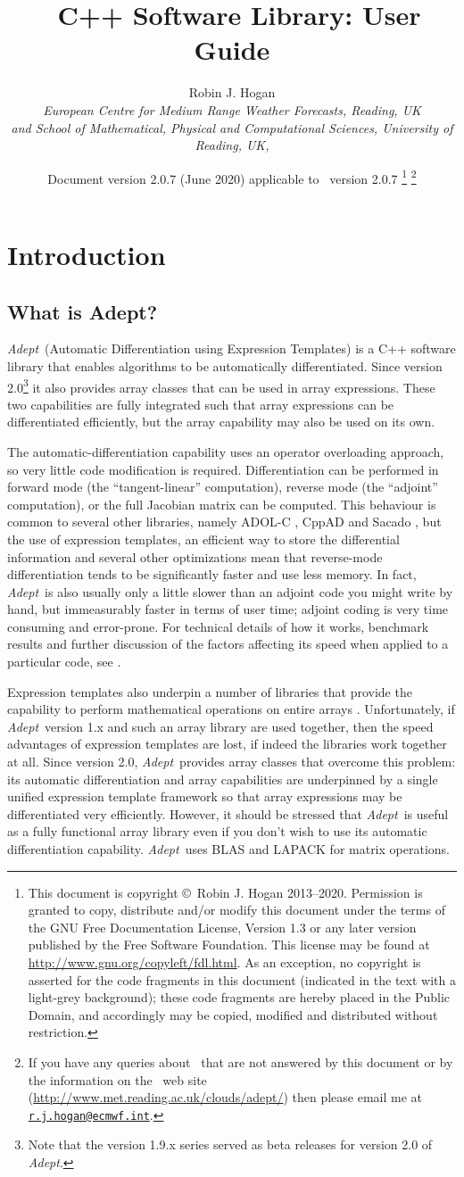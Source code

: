 \documentclass[a4,oneside]{book}
\title{\Adept\ C++ Software Library: User Guide}
\author{Robin J. Hogan\\ \emph{European Centre for Medium Range
    Weather Forecasts, Reading, UK}\\ \emph{and School of
    Mathematical, Physical and Computational Sciences, University of
    Reading, UK,}}
\date{Document version 2.0.7 (June 2020) applicable to \Adept\ version
  2.0.7 \thanks{This document is copyright \copyright\ Robin J. Hogan
    2013--2020.  Permission is granted to copy, distribute and/or
    modify this document under the terms of the GNU Free Documentation
    License, Version 1.3 or any later version published by the Free
    Software Foundation. This license may be found at
    \url{http://www.gnu.org/copyleft/fdl.html}.  As an exception, no
    copyright is asserted for the code fragments in this document
    (indicated in the text with a light-grey background); these code
    fragments are hereby placed in the Public Domain, and accordingly
    may be copied, modified and distributed without restriction.}
  \thanks{If you have any queries about \Adept\ that are not answered
    by this document or by the information on the \Adept\ web site
    (\url{http://www.met.reading.ac.uk/clouds/adept/}) then please
    email me at
    \href{mailto:r.j.hogan@ecmwf.int}{\texttt{r.j.hogan@ecmwf.int}}.}}
\def\Adept{\emph{Adept}}
\renewcommand\thefootnote{\relax}
\begin{document}
\maketitle

\tableofcontents
\def\thefootnote{\fnsymbol{footnote}}
\chapter{Introduction}
\section{What is Adept?}
\Adept\ (Automatic Differentiation using Expression Templates) is a
C++ software library that enables algorithms to be automatically
differentiated. Since version 2.0\footnote{Note that the version 1.9.x
  series served as beta releases for version 2.0 of \Adept.} it also
provides array classes that can be used in array expressions.  These
two capabilities are fully integrated such that array expressions can
be differentiated efficiently, but the array capability may also be
used on its own.

The automatic-differentiation capability uses an operator overloading
approach, so very little code modification is
required. Differentiation can be performed in forward mode (the
``tangent-linear'' computation), reverse mode (the ``adjoint''
computation), or the full Jacobian matrix can be computed. This
behaviour is common to several other libraries, namely ADOL-C
\citep{Griewank+1996}, CppAD \citep{Bell2007} and Sacado
\citep{Gay2005}, but the use of expression templates, an efficient way
to store the differential information and several other optimizations
mean that reverse-mode differentiation tends to be significantly
faster and use less memory. In fact, \Adept\ is also usually only a
little slower than an adjoint code you might write by hand, but
immeasurably faster in terms of user time; adjoint coding is very time
consuming and error-prone. For technical details of how it works,
benchmark results and further discussion of the factors affecting its
speed when applied to a particular code, see \cite{Hogan2014}.

Expression templates also underpin a number of libraries that provide
the capability to perform mathematical operations on entire arrays
\citep{Veldhuizen1995}. Unfortunately, if \Adept\ version 1.x and such
an array library are used together, then the speed advantages of
expression templates are lost, if indeed the libraries work together
at all. Since version 2.0, \Adept\ provides array classes that
overcome this problem: its automatic differentiation and array
capabilities are underpinned by a single unified expression template
framework so that array expressions may be differentiated very
efficiently.  However, it should be stressed that \Adept\ is useful as
a fully functional array library even if you don't wish to use its
automatic differentiation capability. \Adept\ uses BLAS and LAPACK for
matrix operations.
\end{document}
